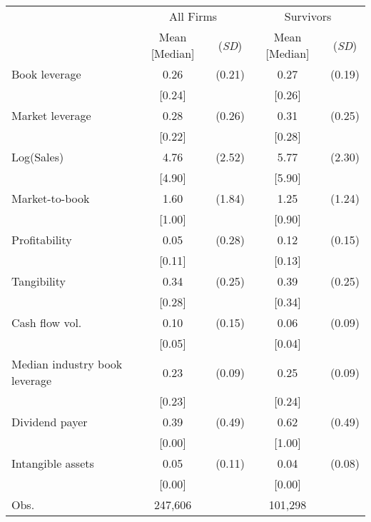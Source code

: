 {
\def\sym#1{\ifmmode^{#1}\else\(^{#1}\)\fi}
\begin{tabular}{l*{2}{cc}}
\toprule
                    &\multicolumn{2}{c}{All Firms}&\multicolumn{2}{c}{Survivors}\\\cmidrule(lr){2-3}\cmidrule(lr){4-5}
                    &\multicolumn{1}{p{1.5cm}}{\centering Mean [Median]}&\multicolumn{1}{p{1.5cm}}{\centering (\textit{SD})}&\multicolumn{1}{p{1.5cm}}{\centering Mean [Median]}&\multicolumn{1}{p{1.5cm}}{\centering (\textit{SD})}\\
\midrule
Book leverage       &        0.26&      (0.21)&        0.27&      (0.19)\\
                    &      [0.24]&            &      [0.26]&            \\
Market leverage     &        0.28&      (0.26)&        0.31&      (0.25)\\
                    &      [0.22]&            &      [0.28]&            \\
Log(Sales)          &        4.76&      (2.52)&        5.77&      (2.30)\\
                    &      [4.90]&            &      [5.90]&            \\
Market-to-book      &        1.60&      (1.84)&        1.25&      (1.24)\\
                    &      [1.00]&            &      [0.90]&            \\
Profitability       &        0.05&      (0.28)&        0.12&      (0.15)\\
                    &      [0.11]&            &      [0.13]&            \\
Tangibility         &        0.34&      (0.25)&        0.39&      (0.25)\\
                    &      [0.28]&            &      [0.34]&            \\
Cash flow vol.      &        0.10&      (0.15)&        0.06&      (0.09)\\
                    &      [0.05]&            &      [0.04]&            \\
Median industry book leverage&        0.23&      (0.09)&        0.25&      (0.09)\\
                    &      [0.23]&            &      [0.24]&            \\
Dividend payer      &        0.39&      (0.49)&        0.62&      (0.49)\\
                    &      [0.00]&            &      [1.00]&            \\
Intangible assets   &        0.05&      (0.11)&        0.04&      (0.08)\\
                    &      [0.00]&            &      [0.00]&            \\
\midrule
Obs.                &     247,606&            &     101,298&            \\
\bottomrule
\end{tabular}
}
